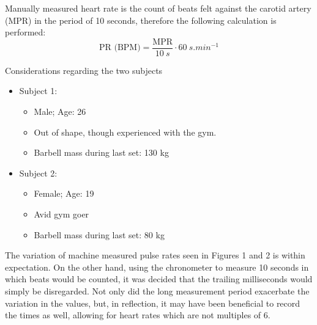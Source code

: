 Manually measured heart rate is the count of beats felt against the carotid artery (MPR) in the period of 10 seconds, therefore the following calculation is performed:
\begin{equation}
    \text{PR (BPM)} = \frac{\text{MPR}}{\SI{10}{s}} \cdot \SI{60}{s.min^{-1}}
\end{equation}

Considerations regarding the two subjects
\begin{itemize}
    \item Subject 1:
    \begin{itemize}
        \item Male; Age: 26
        \item Out of shape, though experienced with the gym.
        \item Barbell mass during last set: 130 kg
    \end{itemize}
    \item Subject 2:
    \begin{itemize}
        \item Female; Age: 19
        \item Avid gym goer
        \item Barbell mass during last set: 80 kg
    \end{itemize}
\end{itemize}
The variation of machine measured pulse rates seen in Figures 1 and 2 is within expectation.
On the other hand, using the chronometer to measure 10 seconds in which beats would be counted, it was decided that the trailing milliseconds would simply be disregarded.
Not only did the long measurement period exacerbate the variation in the values, but, in reflection, it may have been beneficial to record the times as well, allowing for heart rates which are not multiples of 6. 
